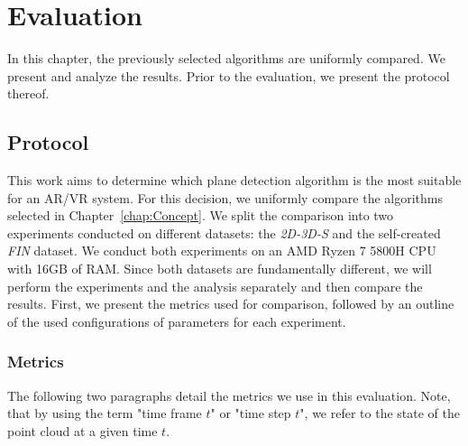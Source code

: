 \documentclass[main.tex]{subfiles}
\begin{document}
\chapter{Evaluation}
\label{chap:eval}
In this chapter, the previously selected algorithms are uniformly compared. We present and analyze the results.
Prior to the evaluation, we present the protocol thereof.
\section{Protocol}

This work aims to determine which plane detection algorithm is the most suitable for an AR/VR system. For this decision, we uniformly compare the algorithms selected in
Chapter~\ref{chap:Concept}. We split the comparison into two experiments conducted on different datasets: the \textit{2D-3D-S} and the
self-created \textit{FIN} dataset.
We conduct both experiments on an AMD Ryzen 7 5800H CPU with 16GB of RAM.
Since both datasets are fundamentally different, we will perform the experiments and the analysis separately and then compare the results.
First, we present the metrics used for comparison, followed by an outline of the used configurations of parameters for each experiment.

\subsection{Metrics}
\label{subsec:metrics}
The following two paragraphs detail the metrics we use in this evaluation. Note, that by using the term "time frame $t$" or "time step $t$", we refer to 
the state of the point cloud at a given time $t$.
\end{document}

